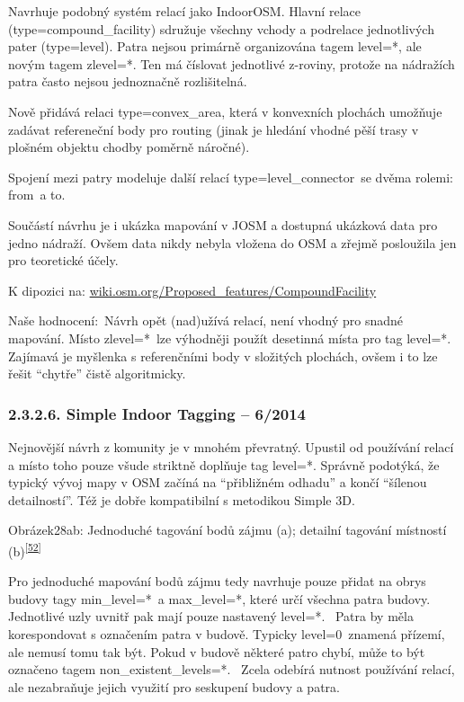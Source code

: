 Navrhuje podobný systém relací jako IndoorOSM. Hlavní relace (type=compound\_facility) sdružuje všechny vchody a podrelace jednotlivých pater (type=level). Patra nejsou primárně organizována tagem level=*, ale novým tagem zlevel=*. Ten má číslovat jednotlivé z-roviny, protože na nádražích patra často nejsou jednoznačně rozlišitelná.

Nově přidává relaci type=convex\_area, která v konvexních plochách umožňuje zadávat refereneční body pro routing (jinak je hledání vhodné pěší trasy v plošném objektu chodby poměrně náročné).

Spojení mezi patry modeluje další relací type=level\_connector~se dvěma rolemi: from~a to.

Součástí návrhu je i ukázka mapování v JOSM a dostupná ukázková data pro jedno nádraží. Ovšem data nikdy nebyla vložena do OSM a zřejmě posloužila jen pro teoretické účely.

K dipozici na: \href{}{wiki.osm.org/Proposed\_features/CompoundFacility}

Naše hodnocení:~Návrh opět (nad)užívá relací, není vhodný pro snadné mapování. Místo zlevel=*~lze výhodněji použít desetinná místa pro tag level=*. Zajímavá je myšlenka s referenčními body v složitých plochách, ovšem i to lze řešit ``chytře'' čistě algoritmicky.

\subsubsection{2.3.2.6. Simple Indoor Tagging -- 6/2014}\label{simple-indoor-tagging-62014}

Nejnovější návrh z komunity je v mnohém převratný. Upustil od používání relací a místo toho pouze všude striktně doplňuje tag level=*. Správně podotýká, že typický vývoj mapy v OSM začíná na ``přibližném odhadu'' a končí ``šílenou detailností''. Též je dobře kompatibilní s metodikou Simple 3D.

Obrázek28ab: Jednoduché tagování bodů zájmu (a); detailní tagování místností (b)\textsuperscript{\href{}{{[}52{]}}}

Pro jednoduché mapování bodů zájmu tedy navrhuje pouze přidat na obrys budovy tagy min\_level=*~a max\_level=*, které určí všechna patra budovy. Jednotlivé uzly uvnitř pak mají pouze nastavený level=*. ~Patra by měla korespondovat s označením patra v budově. Typicky level=0~znamená přízemí, ale nemusí tomu tak být. Pokud v budově některé patro chybí, může to být označeno tagem non\_existent\_levels=*. ~Zcela odebírá nutnost používání relací, ale nezabraňuje jejich využití pro seskupení budovy a patra.


